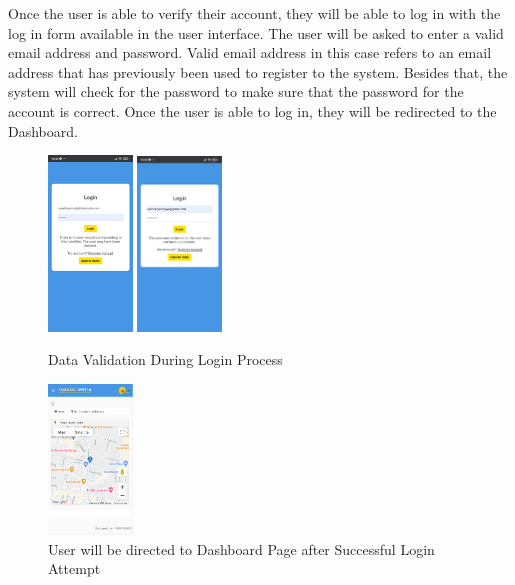\documentclass[conference]{IEEEtran}
\begin{document}
Once the user is able to verify their account, they will be able to log in with the log in form available in the user interface. The user will be asked to enter a valid email address and password. Valid email address in this case refers to 
an email address that has previously been used to register to the system. Besides that, the system will check for the password to make sure that the password for the account is correct. Once the user 
is able to log in, they will be redirected to the Dashboard. 
\begin{figure}[htbp]
    \centering
    \includegraphics[width=0.2\textwidth]{loginfail1}
    \includegraphics[width=0.2\textwidth]{loginfail2}
    \caption{Data Validation During Login Process}
    \label{fig1}
\end{figure}
\begin{figure}[htbp]
    \centering
    \includegraphics[width=0.2\textwidth]{tampilandashboard}
    \caption{User will be directed to Dashboard Page after Successful Login Attempt}
    \label{fig1}
\end{figure}
\end{document}

